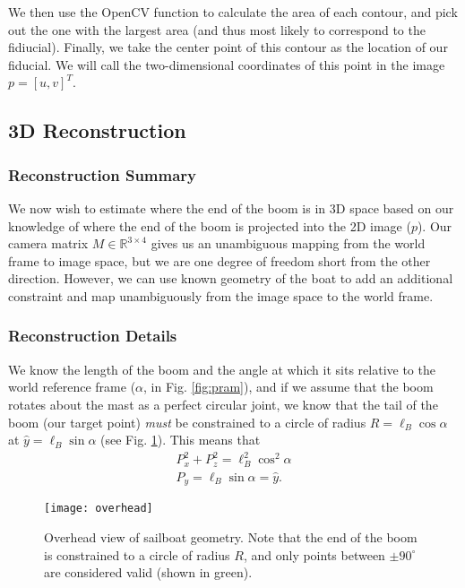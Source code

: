\documentclass[letterpaper, 10 pt, conference]{ieeeconf}  %
\newcommand{\real}[1]{\mathbb{R}^{#1}}
\begin{document}
We then use the OpenCV function  to calculate the area of each contour, and pick out the one  with the largest area (and thus most likely to correspond to the fidiucial). Finally, we take the center point of this contour as the location of our fiducial. We will call the two-dimensional coordinates of this point in the image $p = [u,v]^T$.

\subsection{3D Reconstruction}
\label{sec:3d}
\subsubsection{Reconstruction Summary}
We now wish to estimate where the end of the boom is in 3D space based on our knowledge of where the end of the boom is projected into the 2D image ($p$). Our camera matrix $M \in \real{3 \times 4}$ gives us an unambiguous mapping from the world frame to image space, but we are one degree of freedom short from the other direction. However, we can use known geometry of the boat to add an additional constraint and map unambiguously from the image space to the world frame. 

\subsubsection{Reconstruction Details}

We know the length of the boom and the angle at which it sits relative to the world reference frame ($\alpha$, in Fig. \ref{fig:pram}), and if we assume that the boom rotates about the mast as a perfect circular joint, we know that the tail of the boom (our target point) \emph{must} be constrained to a circle of radius $R = \ell_B\cos{\alpha}$ at $\hat{y} = \ell_B\sin\alpha$ (see Fig. \ref{fig:overhead}). This means that
\begin{gather}
P_x^2 + P_z^2 = \ell_B^2\cos^2{\alpha}\label{eq:planar}\\
P_y = \ell_B\sin\alpha = \hat{y}.
\end{gather}


\begin{figure}[htbp]
   \centering
   \texttt{[image: overhead]} %
   \caption{Overhead view of sailboat geometry. Note that the end of the boom is constrained to a circle of radius $R$, and only points between $\pm 90^\circ$ are considered valid (shown in green).}
   \label{fig:overhead}
\end{figure}
\end{document}
